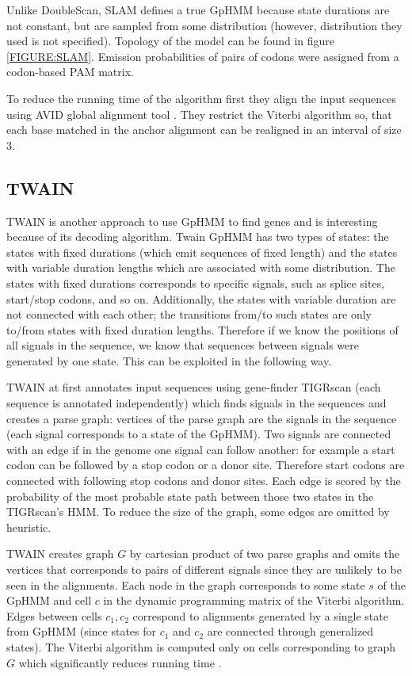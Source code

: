 Unlike DoubleScan, SLAM defines a true GpHMM because state durations are not
constant, but are sampled from some distribution (however, distribution they
used is not specified). Topology of the model can be found in figure
\ref{FIGURE:SLAM}.  Emission probabilities of pairs of codons were assigned from
a codon-based PAM matrix.


To reduce the running time of the algorithm first they  align the input
sequences using AVID global alignment tool \cite{Bray2003}. They restrict the
Viterbi algorithm so, that each base matched in the anchor alignment can be
realigned in an interval of size $3$.

\subsection{TWAIN}

TWAIN is another approach to use GpHMM to find genes \cite{Majoros2005} and is
interesting because of its decoding algorithm. Twain GpHMM has two types of
states: the states with fixed durations (which emit sequences of fixed length)
and the states with variable duration lengths which are associated with some
distribution.  The states with fixed durations corresponds to specific
signals, such as splice sites, start/stop codons, and so on.
Additionally, the states with variable duration are not connected with each
other; the transitions from/to such states are only to/from states with fixed
duration lengths. Therefore if we know the positions of all signals in the
sequence, we know that sequences between signals were generated by one state.
This can be exploited in the following way.

TWAIN at first annotates input sequences using gene-finder TIGRscan
\cite{Majoros2004} (each sequence is annotated independently) which finds
signals in the sequences and creates a parse graph: vertices of the parse graph are
the signals in the sequence (each signal corresponds to a state of the GpHMM).  Two
signals are connected with an edge if in the genome one signal can follow another:
for example a start codon can be followed by a stop codon or a donor site.
Therefore start codons are connected with following stop codons and
donor sites. Each edge is scored by the probability of the most probable state
path between those two states in the TIGRscan's HMM. To reduce the size of the
graph, some edges are omitted by heuristic.

TWAIN creates graph $G$ by cartesian product of two parse graphs and omits the
vertices that corresponds to pairs of different signals since they are unlikely
to be seen in the alignments. Each node in the graph corresponds to some state $s$
of the GpHMM and cell $c$ in the dynamic programming matrix of the Viterbi
algorithm.   Edges between cells $c_1,c_2$ correspond to alignments
generated by a single state from GpHMM (since states for $c_1$ and $c_2$ are
connected through generalized states).  The Viterbi algorithm is computed only
on cells corresponding to graph $G$ which significantly reduces running time
\cite{Majoros2005}.


